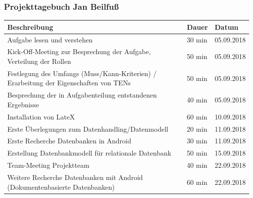 \subsubsection{Projekttagebuch Jan Beilfuß}
\begin{longtable}{|p{10cm}|p{2cm}|p{2cm}|}
\hline
{\textbf{Beschreibung}} & {\textbf{Dauer}} & {\textbf{Datum}} \\ \hline
Aufgabe lesen und verstehen                                                              & 30 min                                & 05.09.2018                            \\ \hline
		Kick-Off-Meeting zur Besprechung der Aufgabe, Verteilung der Rollen                      & 50 min                                & 05.09.2018                            \\ \hline
		Festlegung des Umfangs (Muss/Kann-Kriterien) / Erarbeitung der Eigenschaften von TENs    & 50 min                                & 05.09.2018                            \\ \hline
		Besprechung der in Aufgabenteilung entstandenen Ergebnisse                               & 40 min                                & 05.09.2018                            \\ \hline
		Installation von LateX                                                                   & 60 min                                & 10.09.2018                            \\ \hline
		Erste Überlegungen zum Datenhandling/Datenmodell                                         & 20 min                                & 11.09.2018                            \\ \hline
		Erste Recherche Datenbanken in Android                                                   & 30 min                                & 11.09.2018                            \\ \hline
		Erstellung Datenbankmodell für relationale Datenbank                                     & 50 min                                & 15.09.2018                            \\ \hline
		Team-Meeting Projektteam                                                                 & 40 min                                & 22.09.2018                            \\ \hline
		Weitere Recherche Datenbanken mit Android (Dokumentenbasierte Datenbanken)               & 60 min                                & 22.09.2018                            \\ \hline

\end{longtable}
